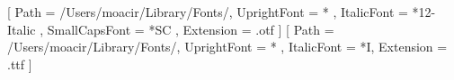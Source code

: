 %
%

\usepackage{graphicx}			%
\usepackage{booktabs}			%
\usepackage{tabulary}			%
\usepackage{xcolor}				%
\usepackage{acronym}      %

\usepackage{fontspec}			%
\setmainfont{EBGaramond}[
  Path = /Users/moacir/Library/Fonts/,
  UprightFont = * ,
  ItalicFont = *12-Italic ,
  SmallCapsFont = *SC ,
  Extension = .otf 
  ]
\setmonofont[Scale=0.8]{UbuntuMono-R}[
  Path = /Users/moacir/Library/Fonts/,
  UprightFont = * ,
  ItalicFont = *I,
  Extension = .ttf 
  ]

\usepackage[notes, 
	includeall=false, %
	doi=true,
	citereset=chapter,
	maxbibnames=500, %
	short,
	backend=biber]{biblatex-chicago} %

\usepackage{pdflscape}			%

\usepackage{pstricks}			%

\usepackage{longtable}			%

\newif\ifendnotes


